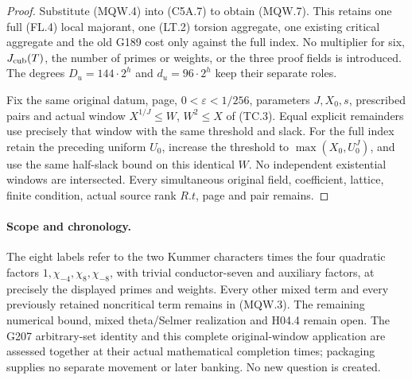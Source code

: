 \begin{proof}
Substitute (MQW.4) into (C5A.7) to obtain (MQW.7).
This retains one full (FL.4) local majorant, one (LT.2) torsion
aggregate, one existing critical aggregate and the old G189
cost only against the full index. No multiplier for six,
$J_{\rm cub}(T)$, the number of primes or weights, or the
three proof fields is introduced. The degrees
$D_u=144\cdot2^h$ and $d_u=96\cdot2^h$ keep their separate roles.

Fix the same original datum, page, $0<\varepsilon<1/256$,
parameters $J,X_0,s$, prescribed pairs and actual window
$X^{1/J}\leq W$, $W^2\leq X$ of (TC.3).
Equal explicit remainders use precisely that window with
the same threshold and slack. For the full index retain the
preceding uniform $U_0$, increase the threshold to
$\max(X_0,U_0^J)$, and use the same half-slack bound on this
identical $W$. No independent existential windows are intersected.
Every simultaneous original field, coefficient, lattice, finite
condition, actual source rank $R.t$, page and pair remains.
\end{proof}

\paragraph{Scope and chronology.}
The eight labels refer to the two Kummer characters times
the four quadratic factors $1,\chi_{-4},\chi_8,\chi_{-8}$,
with trivial conductor-seven and auxiliary factors, at precisely
the displayed primes and weights. Every other mixed term and
every previously retained noncritical term remains in (MQW.3).
The remaining numerical bound, mixed theta/Selmer realization
and H04.4 remain open. The G207 arbitrary-set identity and
this complete original-window application are assessed together
at their actual mathematical completion times; packaging supplies
no separate movement or later banking. No new question is created.

